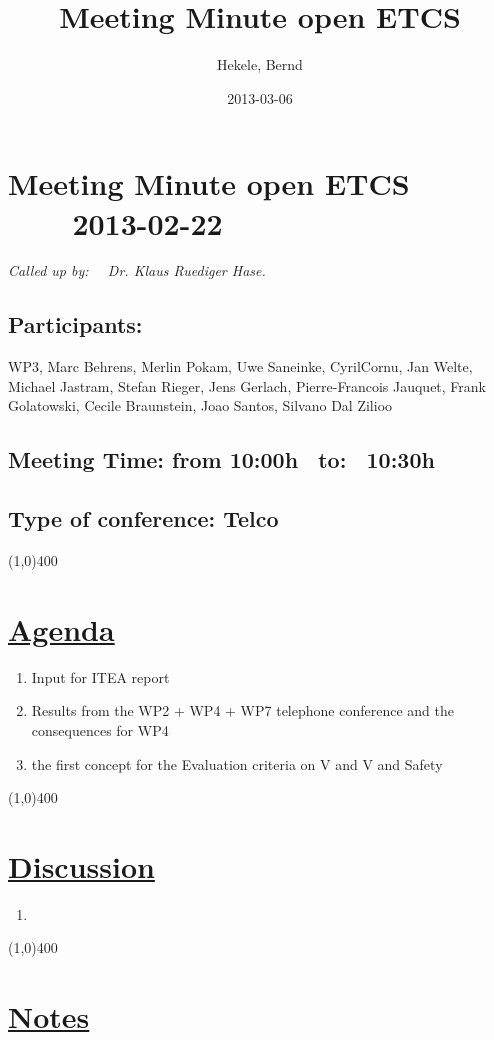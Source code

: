 \documentclass[a4paper]{article}
\title{Meeting Minute open ETCS}
\author{Hekele, Bernd}
\date{2013-03-06}
\begin{document}
\section*{\large{Meeting Minute open ETCS \ \ \ \ 2013-02-22}}

\large{\emph{Called up by: \ \  Dr. Klaus Ruediger Hase.}}

\subsection*{Participants:}WP3, Marc Behrens, Merlin Pokam, Uwe Saneinke, CyrilCornu, Jan Welte, Michael Jastram, Stefan Rieger, Jens Gerlach, Pierre-Francois Jauquet, Frank Golatowski, Cecile Braunstein,  Joao Santos, Silvano Dal Zilioo \\

\subsection*{Meeting Time: from 10:00h \ to: \ 10:30h}
\subsection*{Type of conference: Telco}

\line(1,0){400}
\section*{\underline{Agenda}}
\begin{enumerate}

\item Input for ITEA report
\item Results from the WP2 + WP4 + WP7 telephone conference and the consequences for WP4
\item the first concept for the Evaluation criteria on V and V and Safety 

\end{enumerate}
\line(1,0){400}
\section*{\underline{Discussion}}

\begin{enumerate}
\item 

\end{enumerate}

\line(1,0){400}
\section*{\underline{Notes}}
\end{document}
